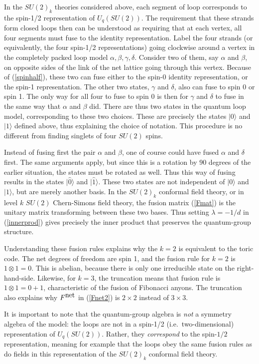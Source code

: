 \documentclass[11pt]{article}
\newcommand{\wwr}{|\widehat{0}\rangle}
\newcommand{\xxr}{|\widehat{1}\rangle}
\begin{document}
In the $SU(2)_k$ theories considered above, each segment of loop
corresponds to the spin-1/2 representation of $U_q(SU(2))$.  The
requirement that these strands form closed loops then can be
understood as requiring that at each vertex, all four segments must
fuse to the identity representation.  Label the four strands (or
equivalently, the four spin-1/2 representations) going clockwise
around a vertex in the completely packed loop model
$\alpha,\beta,\gamma,\delta$. Consider two of them, say $\alpha$ and
$\beta$, on opposite sides of the link of the net lattice going
through this vertex. Because of
(\ref{spinhalf}), these two can fuse either to the spin-0 identity
representation, or the spin-1 representation. The other two states,
$\gamma$ and $\delta$, also can fuse to spin 0 or spin 1. The only way
for all four to fuse to spin $0$ is then for $\gamma$ and $\delta$ to fuse
in the same way that $\alpha$ and $\beta$ did. There are thus two states in
the quantum loop model, corresponding to these two choices. These are
precisely the states $|0\rangle$ and $|1\rangle$ defined above, thus
explaining the choice of notation. This procedure is no different from 
finding singlets of four $SU(2)$ spins.

Instead of fusing first the pair $\alpha$ and $\beta$, one of course
could have fused $\alpha$ and $\delta$ first. The same arguments
apply, but since this is a rotation by $90$ degrees of the earlier
situation, the states must be rotated as well. Thus this way of fusing
results in the states $\wwr$ and $\xxr$.  These two states are not
independent of $|0\rangle$ and $|1\rangle$, but are merely another
basis. In the $SU(2)_k$ conformal field theory, or in level $k$
$SU(2)$ Chern-Simons field theory, the fusion matrix (\ref{Fmat}) is
the unitary matrix transforming between these two bases. Thus setting
$\lambda=-1/d$ in (\ref{innerprod}) gives precisely the inner product
that preserves the quantum-group structure.


Understanding these fusion rules explains why the $k=2$ is equivalent
to the toric code. The net degrees of freedom are spin 1, and the
fusion rule for $k=2$ is $1\otimes 1 =0$. This is abelian, because
there is only one irreducible state on the right-hand-side. Likewise,
for $k=3$, the truncation means that fusion rule is $1\otimes 1= 0 +
1$, characteristic of the fusion of Fibonacci anyons. The truncation
also explains why $F^{\hbox{net}}$ in (\ref{Fnet2}) is $2\times 2$
instead of $3\times 3$. 


It is important to note that the quantum-group algebra is {\em
not} a symmetry algebra of the model: the loops are not in a spin-1/2
(i.e.\ two-dimensional) representation of $U_q(SU(2))$. Rather, they
{\em correspond} to the spin-$1/2$ representation, meaning for example
that the loops obey the same fusion rules as do fields in this
representation of the $SU(2)_k$ conformal field theory.
\end{document}
